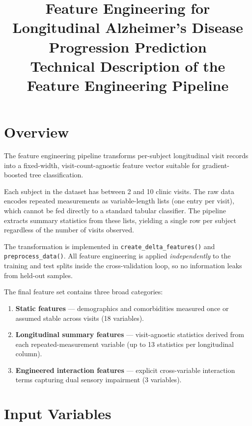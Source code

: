 \documentclass[11pt]{article}
\title{\textbf{Feature Engineering for Longitudinal Alzheimer's Disease Progression Prediction}\\[0.5em]
\large Technical Description of the Feature Engineering Pipeline}
\author{}
\date{}
\begin{document}
\maketitle
\tableofcontents
\newpage

\section{Overview}
\label{sec:overview}

The feature engineering pipeline transforms per-subject longitudinal visit records into a fixed-width, visit-count-agnostic feature vector suitable for gradient-boosted tree classification.

Each subject in the dataset has between 2 and 10 clinic visits.  The raw data encodes repeated measurements as variable-length lists (one entry per visit), which cannot be fed directly to a standard tabular classifier.  The pipeline extracts summary statistics from these lists, yielding a single row per subject regardless of the number of visits observed.

The transformation is implemented in \texttt{create\_delta\_features()} and \texttt{preprocess\_data()}.  All feature engineering is applied \emph{independently} to the training and test splits inside the cross-validation loop, so no information leaks from held-out samples.

The final feature set contains three broad categories:
\begin{enumerate}
    \item \textbf{Static features} --- demographics and comorbidities measured once or assumed stable across visits (18 variables).
    \item \textbf{Longitudinal summary features} --- visit-agnostic statistics derived from each repeated-measurement variable (up to 13 statistics per longitudinal column).
    \item \textbf{Engineered interaction features} --- explicit cross-variable interaction terms capturing dual sensory impairment (3 variables).
\end{enumerate}

\section{Input Variables}
\label{sec:input}
\end{document}
